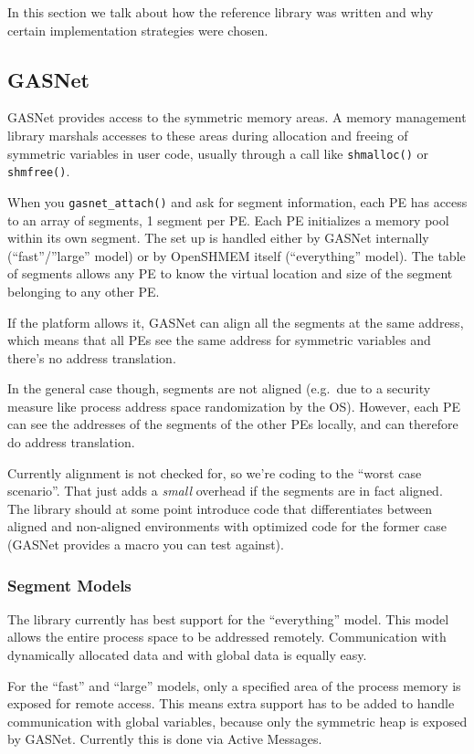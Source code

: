 \documentclass[english]{article}
\begin{document}
In this section we talk about how the reference library was written
and why certain implementation strategies were chosen.

\subsection{GASNet}

GASNet provides access to the symmetric memory areas. A memory
management library marshals accesses to these areas during allocation
and freeing of symmetric variables in user code, usually through a
call like \texttt{shmalloc()} or \texttt{shmfree()}.

When you \texttt{gasnet\_attach()} and ask for segment information,
each PE has access to an array of segments, 1 segment per PE. Each PE
initializes a memory pool within its own segment. The set up is
handled either by GASNet internally (``fast''/''large'' model) or by
OpenSHMEM itself (``everything'' model). The table of segments
allows any PE to know the virtual location and size of the segment
belonging to any other PE.

If the platform allows it, GASNet can align all the segments at the
same address, which means that all PEs see the same address for
symmetric variables and there's no address translation.

In the general case though, segments are not aligned (e.g.\ due to a
security measure like process address space randomization by the
OS). However, each PE can see the addresses of the segments of the
other PEs locally, and can therefore do address translation.

Currently alignment is not checked for, so we're coding to the
``worst case scenario''. That just adds a \emph{small} overhead if
the segments are in fact aligned. The library should at some point
introduce code that differentiates between aligned and non-aligned
environments with optimized code for the former case (GASNet provides
a macro you can test against).

\subsubsection{Segment Models}

The library currently has best support for the ``everything''
model. This model allows the entire process space to be addressed
remotely. Communication with dynamically allocated data and with
global data is equally easy.

For the ``fast'' and ``large'' models, only a specified area of
the process memory is exposed for remote access. This means extra
support has to be added to handle communication with global variables,
because only the symmetric heap is exposed by GASNet. Currently this
is done via Active Messages.
\end{document}
